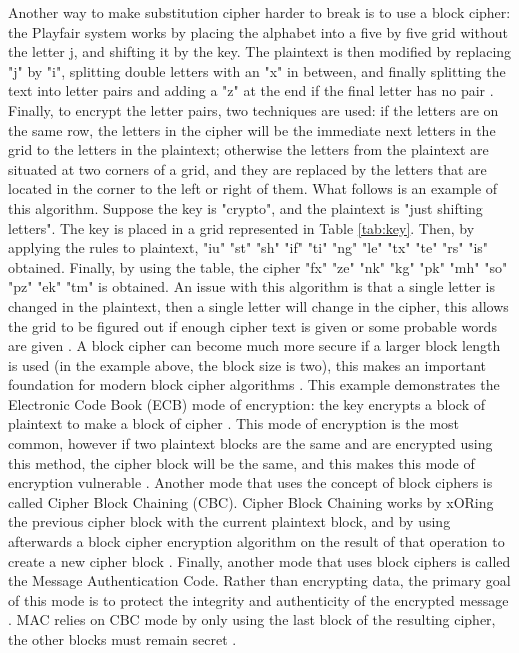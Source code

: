 \documentclass{l4proj}
\begin{document}
Another way to make substitution cipher harder to break is to use a block cipher: the Playfair system works by placing the
alphabet into a five by five grid without the letter j, and shifting it by the key. The plaintext is then modified by replacing "j" by "i", 
splitting double letters with an "x" in between, and finally splitting the text into letter pairs and adding a "z" at the end if the final letter has no pair \citep{anderson_security_2008}.
Finally, to encrypt the letter pairs, two techniques are used: if the letters are on the same row, the letters in the cipher will be the immediate next letters in the grid 
to the letters in the plaintext; otherwise the letters from the plaintext are situated at two corners of a grid, and they are replaced by the letters that are located in the corner to the left or right of them. 
What follows is an example of this algorithm. Suppose the key is "crypto", and the plaintext is "just shifting letters".
The key is placed in a grid represented in Table \ref{tab:key}. Then, by applying the rules to plaintext, "iu" "st" "sh" "if" "ti" "ng" "le" "tx" "te" "rs" "is" obtained.
Finally, by using the table, the cipher "fx" "ze" "nk" "kg" "pk" "mh" "so" "pz" "ek" "tm" is obtained. 
An issue with this algorithm is that a single letter is changed in the plaintext,
then a single letter will change in the cipher, 
this allows the grid to be figured out if enough cipher text is given or some probable words are given \citep{anderson_security_2008}.
A block cipher can become much more secure if a larger block length is used (in the example above, the block size is two), 
this makes an important foundation for modern block cipher algorithms
\citep{anderson_security_2008}. This example demonstrates the Electronic Code Book (ECB) mode of encryption: the key encrypts a block of plaintext to make a block of cipher \citep{kessler_overview_2016}.
This mode of encryption is the most common, however if two plaintext blocks are the same and are encrypted using this method, the cipher block will be the same, 
and this makes this mode of encryption vulnerable \citep{kessler_overview_2016}. Another mode that uses the concept of block ciphers is called Cipher Block Chaining (CBC).
Cipher Block Chaining works by xORing the previous cipher block with the current plaintext block, and by using afterwards a block cipher encryption algorithm
on the result of that operation to create a new cipher block \citep{savage_cse_2019} \citep{kessler_overview_2016}. 
Finally, another mode that uses block ciphers is called the Message Authentication Code. Rather than encrypting data, the primary goal of this mode is to protect the integrity
and authenticity of the encrypted message \citep{anderson_security_2008}. MAC relies on CBC mode by only using the last block of the resulting cipher, 
the other blocks must remain secret \citep{anderson_security_2008}. 
\end{document}
